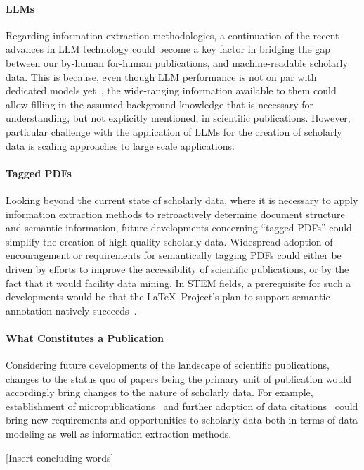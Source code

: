 \paragraph{LLMs}
Regarding information extraction methodologies, a continuation of the recent advances in LLM technology could become a key factor in bridging the gap between our by-human for-human publications, and machine-readable scholarly data.
This is because, even though LLM performance is not on par with dedicated models yet~\cite{Yang2023}, the wide-ranging information available to them could allow filling in the assumed background knowledge that is necessary for understanding, but not explicitly mentioned, in scientific publications.
However, particular challenge with the application of LLMs for the creation of scholarly data is scaling approaches to large scale applications.

\paragraph{Tagged PDFs}
Looking beyond the current state of scholarly data, where it is necessary to apply information extraction methods to retroactively determine document structure and semantic information, future developments concerning ``tagged PDFs'' could simplify the creation of high-quality scholarly data. Widespread adoption of encouragement or requirements for semantically tagging PDFs could either be driven by efforts to improve the accessibility of scientific publications, or by the fact that it would facility data mining. In STEM fields, a prerequisite for such a developments would be that the \LaTeX\ Project's plan to support semantic annotation natively succeeds~\cite{Mittelbach2020,Mittelbach2023}.

\paragraph{What Constitutes a Publication}
Considering future developments of the landscape of scientific publications, changes to the status quo of papers being the primary unit of publication would accordingly bring changes to the nature of scholarly data. For example, establishment of micropublications~\cite{Raciti2018} and further adoption of data citations~\cite{Kratz2015} could bring new requirements and opportunities to scholarly data both in terms of data modeling as well as information extraction methods.

[Insert concluding words]
